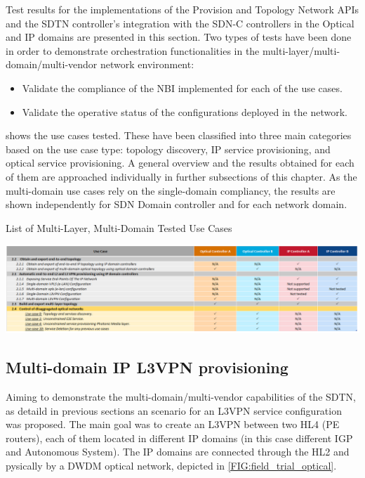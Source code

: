 \documentclass[a4paper,fleqn]{cas-dc}
\begin{document}
Test results for the implementations of the Provision and Topology Network APIs and the SDTN controller’s integration with the SDN-C controllers in the Optical and IP domains are presented in this section. Two types of tests have been done in order to demonstrate orchestration functionalities in the multi-layer/multi-domain/multi-vendor network environment: 
\begin{itemize}
    \item Validate the compliance of the NBI implemented for each of the use cases.
    \item Validate the operative status of the configurations deployed in the network. 
\end{itemize}

 shows the use cases tested. These have been classified into three main categories based on the use case type: topology discovery, IP service provisioning, and optical service provisioning. A general overview and the results obtained for each of them are approached individually in further subsections of this chapter. As the multi-domain use cases rely on the single-domain compliancy, the results are shown independently for SDN Domain controller and for each network domain.

\begin{table}
	\caption{List of Multi-Layer, Multi-Domain Tested Use Cases}
	\centering
		\includegraphics[scale=0.5]{figs/tested_use_cases.png}
	\label{TAB:tested_use_cases}
\end{table}

\subsection{Multi-domain IP L3VPN provisioning}

Aiming to demonstrate the multi-domain/multi-vendor capabilities of the SDTN, as detaild in previous sections an scenario for an L3VPN service configuration was proposed. The main goal was to create an L3VPN between two HL4 (PE routers), each of them located in different IP domains (in this case different IGP and Autonomous System). The IP domains are connected through the HL2 and pysically by a DWDM optical network, depicted in \cref{FIG:field_trial_optical}. 
\end{document}
